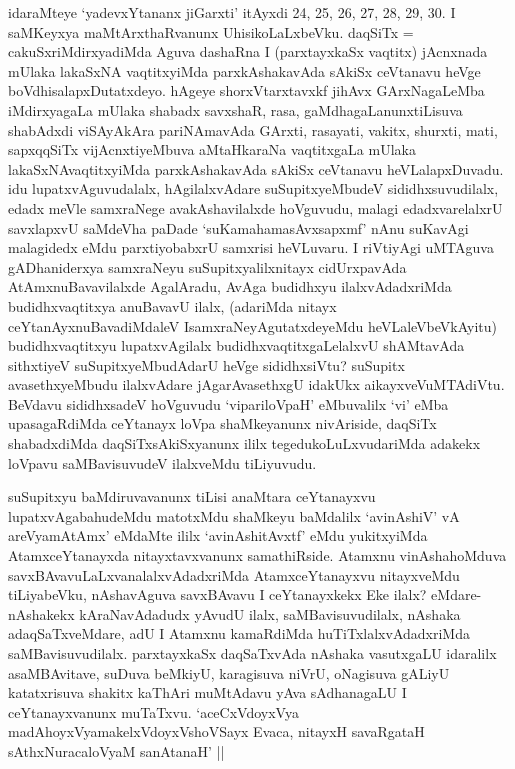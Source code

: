 \begin{artha}
idaraMteye `yadevxYtananx jiGarxti' itAyxdi 24, 25, 26, 27, 28, 29, 30. I saMKeyxya maMtArxthaRvanunx UhisikoLaLxbeVku. daqSiTx = cakuSxriMdirxyadiMda Aguva dashaRna I (parxtayxkaSx vaqtitx) jAcnxnada mUlaka lakaSxNA vaqtitxyiMda parxkAshakavAda sAkiSx ceVtanavu heVge boVdhisalapxDutatxdeyo. hAgeye shorxVtarxtavxkf jihAvx GArxNagaLeMba iMdirxyagaLa mUlaka shabadx savxshaR, rasa, gaMdhagaLanunx\break tiLisuva shabAdxdi viSAyAkAra pariNAmavAda GArxti, rasayati, vakitx, shurxti, mati, sapxqqSiTx vijAcnxtiyeMbuva aMtaHkaraNa vaqtitxgaLa mUlaka lakaSxNAvaqtitxyiMda parxkAshakavAda sAkiSx ceVtanavu heVLalapxDuvadu. idu lupatxvAguvudalalx, hAgilalxvAdare suSupitxyeMbudeV sididhxsuvudilalx, edadx meVle samxraNege avakAshavilalxde hoVguvudu, malagi edadxvarelalxrU savxlapxvU saMdeVha paDade `suKamahamasAvxsapxmf' nAnu suKavAgi malagidedx eMdu parxtiyobabxrU samxrisi heVLuvaru. I riVtiyAgi uMTAguva gADhaniderxya samxraNeyu suSupitxyalilx\break nitayx cidUrxpavAda AtAmxnuBavavilalxde AgalAradu, AvAga budidhxyu ilalxvAdadxriMda budidhxvaqtitxya anuBavavU ilalx, (adariMda nitayx ceYtanAyxnuBavadiMdaleV IsamxraNeyAgutatxdeyeMdu heVLaleV\break beVkAyitu) budidhxvaqtitxyu lupatxvAgilalx budidhxvaqtitxgaLelalxvU shAMtavAda sithxtiyeV suSupitxyeMbudAdarU heVge sididhxsiVtu? suSupitx avasethxyeMbudu ilalxvAdare jAgarAvasethxgU idakUkx aikayxveV\break uMTAdiVtu. BeVdavu sididhxsadeV hoVguvudu `vipariloVpaH' eMbuvalilx `vi' eMba upasagaRdiMda ceYtanayx loVpa shaMkeyanunx nivAriside, daqSiTx shabadxdiMda daqSiTxsAkiSxyanunx ililx tegedukoLuLxvudariMda adakekx loVpavu saMBavisuvudeV ilalxveMdu tiLiyuvudu.
\end{artha}





\begin{artha}%
suSupitxyu baMdiruvavanunx tiLisi anaMtara ceYtanayxvu lupatxvAgabahudeMdu matotxMdu shaMkeyu baMdalilx `avinAshiV' vA areV\s yamAtAmx' eMdaMte ililx `avinAshitAvxtf' eMdu yukitxyiMda AtamxceYtanayxda nitayxtavxvanunx samathiRside. Atamxnu vinAshahoMduva savxBAvavuLaLxvanalalxvAdadxriMda AtamxceYtanayxvu nitayxveMdu tiLiyabeVku, nAshavAguva savxBAvavu I ceYtanayxkekx Eke ilalx? eMdare- nAshakekx kAraNavAdadudx yAvudU ilalx, saMBavisuvudilalx, nAshaka adaqSaTxveMdare, adU I Atamxnu kamaRdiMda huTiTxlalxvAdadxriMda saMBavisuvudilalx. parxtayxkaSx daqSaTxvAda nAshaka vasutxgaLU idaralilx asaMBAvitave, suDuva beMkiyU, karagisuva niVrU, oNagisuva gALiyU katatxrisuva shakitx kaThAri muMtAdavu yAva sAdhanagaLU I ceYtanayxvanunx muTaTxvu. `aceCxVdoyxV\s ya madAhoyxV\s yamakelxVdoyxV\s shoVSayx Evaca, nitayxH savaRgataH sAthxNuracaloV\s yaM sanAtanaH' ||
\end{artha}

